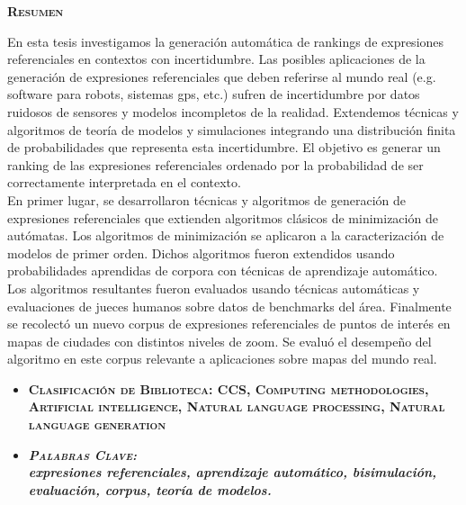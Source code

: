 \thispagestyle{empty}


\begin{center}

{ \vspace*{1cm} }
\huge{\textbf{\textsc{\textmd{Resumen}}}}\\[1cm]

\end{center}

\normalsize{


En esta tesis investigamos la generaci\'on autom\'atica de rankings de
expresiones referenciales en contextos con incertidumbre. Las
posibles aplicaciones de la generaci\'on de expresiones referenciales
que deben referirse al mundo real (e.g. software para robots, sistemas
gps, etc.) sufren de incertidumbre por datos ruidosos de sensores y
modelos incompletos de la realidad. Extendemos t\'ecnicas y algoritmos
de teor\'ia de modelos y simulaciones integrando una distribuci\'on finita
de probabilidades que representa esta incertidumbre. El objetivo es
generar un ranking de las expresiones referenciales ordenado por la
probabilidad de ser correctamente interpretada en el contexto. \\
En primer lugar, se desarrollaron t\'ecnicas y algoritmos de generaci\'on de
expresiones referenciales que extienden algoritmos cl\'asicos de
minimizaci\'on de aut\'omatas. Los algoritmos de minimizaci\'on se aplicaron a la caracterizaci\'on de modelos de
primer orden. Dichos algoritmos fueron extendidos usando
probabilidades aprendidas de corpora con t\'ecnicas de aprendizaje
autom\'atico. Los algoritmos resultantes fueron evaluados usando
t\'ecnicas autom\'aticas y evaluaciones de jueces humanos sobre datos de
benchmarks del \'area. Finalmente se recolect\'o un nuevo corpus de
expresiones referenciales de puntos de inter\'es en mapas de ciudades
con distintos niveles de zoom. Se evalu\'o el desempe\~no del algoritmo en
este corpus relevante a aplicaciones sobre mapas del mundo real.
}

\begin{itemize}
	\item \textbf{\textsc{Clasificaci\'on de Biblioteca: CCS, Computing methodologies, Artificial intelligence, Natural language processing, Natural language generation}}
	\item \textbf{\emph{\textsc{Palabras Clave:} \\ expresiones referenciales, aprendizaje autom\'atico, bisimulaci\'on, evaluaci\'on, corpus, teor\'ia de modelos.}}
\end{itemize}


